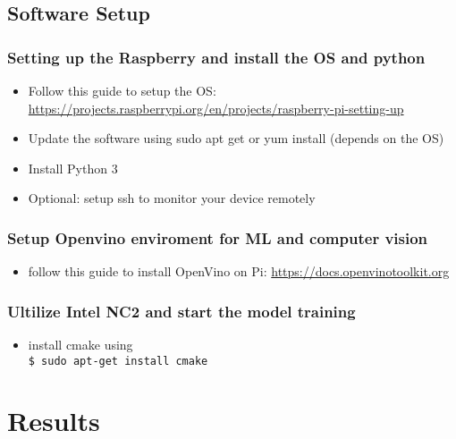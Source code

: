 \documentclass{article}
\begin{document}
\subsection{Software Setup}

\subsubsection{Setting up the Raspberry and install the OS and python}

\begin{itemize}
    \item Follow this guide to setup the OS: \hyperlink{https://projects.raspberrypi.org/en/projects/raspberry-pi-setting-up}{https://projects.raspberrypi.org/en/projects/raspberry-pi-setting-up}
    \item Update the software using sudo apt get or yum install (depends on the OS)
    \item Install Python 3
    \item Optional: setup ssh to monitor your device remotely
\end{itemize}

\subsubsection{Setup Openvino enviroment for ML and computer vision}

\begin{itemize}
    \item follow this guide to install OpenVino on Pi: \href{https://docs.openvinotoolkit.org/latest/_docs_install_guides_installing_openvino_raspbian.html}{https://docs.openvinotoolkit.org} 
\end{itemize}

\subsubsection{Ultilize Intel NC2 and start the model training}

\begin{itemize}
    \item install cmake using \\ \texttt{\$ sudo apt-get install cmake}
\end{itemize}

\section{Results}
\end{document}
